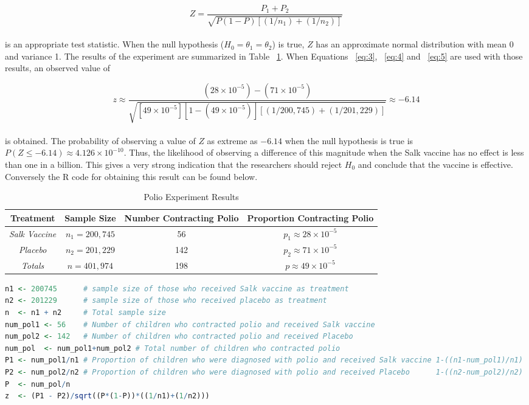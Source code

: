 \documentclass{WileySev}
\begin{document}
\begin{equation}
Z=\frac{P_1+P_2}{\sqrt{P(1-P)[(1/n_1)+(1/n_2)]}}\label{eq:5}
\end{equation}
\\
is an appropriate test statistic. When the null hypothesis ($H_0=\theta_1=\theta_2$) is true, $Z$ has an approximate normal distribution with mean 0 and variance 1.
The results of the experiment are summarized in Table ~\ref{tab:polio}. When Equations ~\ref{eq:3}, ~\ref{eq:4} and ~\ref{eq:5} are used with those results, an observed value of

\begin{equation}
z\approx \frac{(28\times10^{-5})-(71\times10^{-5})}{\sqrt{[49\times10^{-5}][1-(49\times10^{-5})][(1/200,745)+(1/201,229)]}}\approx-6.14
\end{equation}
\\
is obtained. The probability of observing a value of $Z$ as extreme as $-6.14$ when the null hypothesis is true is $P(Z\leq-6.14)\approx4.126\times10^{-10}$. Thus, the likelihood of observing a difference of this magnitude when the Salk vaccine has no effect is less than one in a billion. This gives a very strong indication that the researchers should reject $H_0$ and conclude that the vaccine is effective. Conversely the R code for obtaining this result can be found below.

\begin{table}[h]
\caption{Polio Experiment Results}
\centering
\begin{tabular}{ cccc }
\hline
\textbf{Treatment} & \textbf{Sample Size} & \textbf{Number Contracting Polio} & \textbf{Proportion Contracting Polio} \\
\hline
\textit{Salk Vaccine} & $n_1=200,745$ & 56 & $p_1\approx 28\times 10^{-5}$ \\
\textit{Placebo} & $n_2=201,229$ & 142 & $p_2\approx 71\times 10^{-5}$ \\
\hline
\textit{Totals} & $n=401,974$ & 198 & $p\approx 49\times 10^{-5}$ \\
\hline
\end{tabular}
\label{tab:polio}
\end{table}

\begin{lstlisting}[language=R]
n1 <- 200745      # sample size of those who received Salk vaccine as treatment
n2 <- 201229      # sample size of those who received placebo as treatment
n  <- n1 + n2     # Total sample size
num_pol1 <- 56    # Number of children who contracted polio and received Salk vaccine
num_pol2 <- 142   # Number of children who contracted polio and received Placebo
num_pol  <- num_pol1+num_pol2 # Total number of children who contracted polio
P1 <- num_pol1/n1 # Proportion of children who were diagnosed with polio and received Salk vaccine 1-((n1-num_pol1)/n1)
P2 <- num_pol2/n2 # Proportion of children who were diagnosed with polio and received Placebo      1-((n2-num_pol2)/n2)
P  <- num_pol/n   
z  <- (P1 - P2)/sqrt((P*(1-P))*((1/n1)+(1/n2)))
\end{lstlisting}
\end{document}
